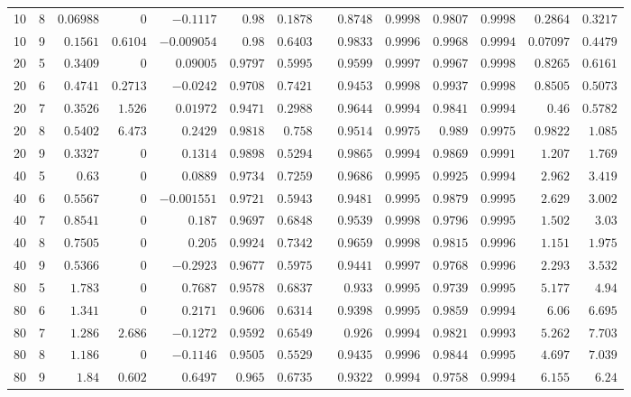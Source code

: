 \begin{table}[ht]
\begin{tabular}{@{}rrrrrrrrrrrrrr@{}}
10 & 8 & $0.06988$ & $0$ & $-0.1117$ & $0.98$ & $0.1878$ &  & $0.8748$ & $0.9998$ & $0.9807$ & $0.9998$ & $0.2864$ & $0.3217$\\
10 & 9 & $0.1561$ & $0.6104$ & $-0.009054$ & $0.98$ & $0.6403$ &  & $0.9833$ & $0.9996$ & $0.9968$ & $0.9994$ & $0.07097$ & $0.4479$\\
20 & 5 & $0.3409$ & $0$ & $0.09005$ & $0.9797$ & $0.5995$ &  & $0.9599$ & $0.9997$ & $0.9967$ & $0.9998$ & $0.8265$ & $0.6161$\\
20 & 6 & $0.4741$ & $0.2713$ & $-0.0242$ & $0.9708$ & $0.7421$ &  & $0.9453$ & $0.9998$ & $0.9937$ & $0.9998$ & $0.8505$ & $0.5073$\\
20 & 7 & $0.3526$ & $1.526$ & $0.01972$ & $0.9471$ & $0.2988$ &  & $0.9644$ & $0.9994$ & $0.9841$ & $0.9994$ & $0.46$ & $0.5782$\\
20 & 8 & $0.5402$ & $6.473$ & $0.2429$ & $0.9818$ & $0.758$ &  & $0.9514$ & $0.9975$ & $0.989$ & $0.9975$ & $0.9822$ & $1.085$\\
20 & 9 & $0.3327$ & $0$ & $0.1314$ & $0.9898$ & $0.5294$ &  & $0.9865$ & $0.9994$ & $0.9869$ & $0.9991$ & $1.207$ & $1.769$\\
40 & 5 & $0.63$ & $0$ & $0.0889$ & $0.9734$ & $0.7259$ &  & $0.9686$ & $0.9995$ & $0.9925$ & $0.9994$ & $2.962$ & $3.419$\\
40 & 6 & $0.5567$ & $0$ & $-0.001551$ & $0.9721$ & $0.5943$ &  & $0.9481$ & $0.9995$ & $0.9879$ & $0.9995$ & $2.629$ & $3.002$\\
40 & 7 & $0.8541$ & $0$ & $0.187$ & $0.9697$ & $0.6848$ &  & $0.9539$ & $0.9998$ & $0.9796$ & $0.9995$ & $1.502$ & $3.03$\\
40 & 8 & $0.7505$ & $0$ & $0.205$ & $0.9924$ & $0.7342$ &  & $0.9659$ & $0.9998$ & $0.9815$ & $0.9996$ & $1.151$ & $1.975$\\
40 & 9 & $0.5366$ & $0$ & $-0.2923$ & $0.9677$ & $0.5975$ &  & $0.9441$ & $0.9997$ & $0.9768$ & $0.9996$ & $2.293$ & $3.532$\\
80 & 5 & $1.783$ & $0$ & $0.7687$ & $0.9578$ & $0.6837$ &  & $0.933$ & $0.9995$ & $0.9739$ & $0.9995$ & $5.177$ & $4.94$\\
80 & 6 & $1.341$ & $0$ & $0.2171$ & $0.9606$ & $0.6314$ &  & $0.9398$ & $0.9995$ & $0.9859$ & $0.9994$ & $6.06$ & $6.695$\\
80 & 7 & $1.286$ & $2.686$ & $-0.1272$ & $0.9592$ & $0.6549$ &  & $0.926$ & $0.9994$ & $0.9821$ & $0.9993$ & $5.262$ & $7.703$\\
80 & 8 & $1.186$ & $0$ & $-0.1146$ & $0.9505$ & $0.5529$ &  & $0.9435$ & $0.9996$ & $0.9844$ & $0.9995$ & $4.697$ & $7.039$\\
80 & 9 & $1.84$ & $0.602$ & $0.6497$ & $0.965$ & $0.6735$ &  & $0.9322$ & $0.9994$ & $0.9758$ & $0.9994$ & $6.155$ & $6.24$\\
\bottomrule
\end{tabular}
\end{table}

